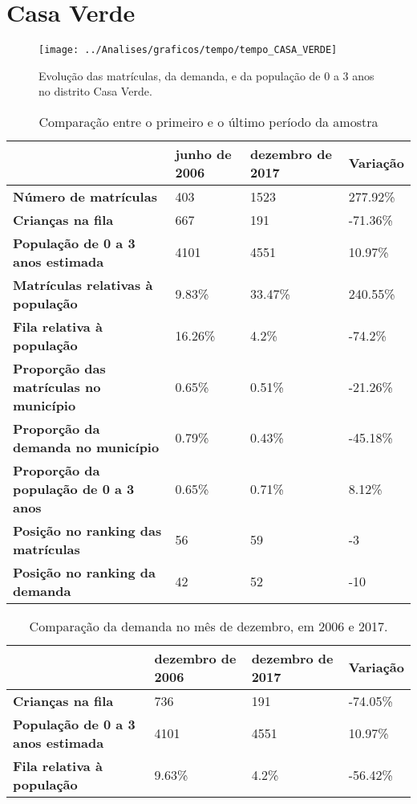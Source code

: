 \section{Casa Verde}
\begin{figure}[H]
\centering
\texttt{[image: ../Analises/graficos/tempo/tempo\_CASA\_VERDE]}
\caption{Evolução das matrículas, da demanda, e da população de 0 a 3 anos no distrito Casa Verde.}
\end{figure}
\begin{table}[H]
\begin{tabular}{|l|l|l|l|}
\hline
\textbf{}                                      & \textbf{junho de 2006}       & \textbf{dezembro de 2017}    & \textbf{Variação} \\ \hline
\textbf{Número de matrículas}                  & 403 & 1523 & 277.92\% \\ \hline
\textbf{Crianças na fila}                      & 667 & 191 & -71.36\% \\ \hline
\textbf{População de 0 a 3 anos estimada}      & 4101 & 4551 & 10.97\% \\ \hline
\textbf{Matrículas relativas à população}      & 9.83\% & 33.47\% & 240.55\% \\ \hline
\textbf{Fila relativa à população}             & 16.26\% & 4.2\% & -74.2\% \\ \hline
\textbf{Proporção das matrículas no município} & 0.65\% & 0.51\% & -21.26\% \\ \hline
\textbf{Proporção da demanda no município}     & 0.79\% & 0.43\% & -45.18\% \\ \hline
\textbf{Proporção da população de 0 a 3 anos}  & 0.65\% & 0.71\% & 8.12\% \\ \hline
\textbf{Posição no ranking das matrículas}     & 56 & 59 & -3 \\ \hline
\textbf{Posição no ranking da demanda}         & 42 & 52 & -10 \\ \hline
\end{tabular}
\caption{Comparação entre o primeiro e o último período da amostra}
\end{table}
\begin{table}[H]
\begin{tabular}{|l|l|l|l|}
\hline
\textbf{}                                 & \textbf{dezembro de 2006} & \textbf{dezembro de 2017} & \textbf{Variação} \\ \hline
\textbf{Crianças na fila}                      & 736 & 191 & -74.05\% \\ \hline
\textbf{População de 0 a 3 anos estimada}      & 4101 & 4551 & 10.97\% \\ \hline
\textbf{Fila relativa à população}             & 9.63\% & 4.2\% & -56.42\% \\ \hline
\end{tabular}
\caption{Comparação da demanda no mês de dezembro, em 2006 e 2017.}
\end{table}
